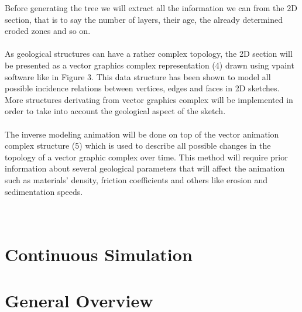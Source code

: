 \documentclass[12pt, a4paper]{memoir} %
\begin{document}
Before generating the tree we will extract all the information we can from the 2D section, that is to say the number of layers, their age, the already determined eroded zones and so on.\\\\

As geological structures can have a rather complex topology, the 2D section will be presented as a vector graphics complex representation (4) drawn using vpaint software like in Figure 3. This data structure has been shown to model all possible incidence relations between vertices, edges and faces in 2D sketches. More structures derivating from vector graphics complex will be implemented in order to take into account the geological aspect of the sketch.\\\\

The inverse modeling animation will be done on top of the vector animation complex structure (5) which is used to describe all possible changes in the topology of a vector graphic complex over time. This method will require prior information about several geological parameters that will affect the animation such as materials’ density, friction coefficients and others like erosion and sedimentation speeds.\\\\\

\section{Continuous Simulation}

\section{General Overview}
\end{document}
